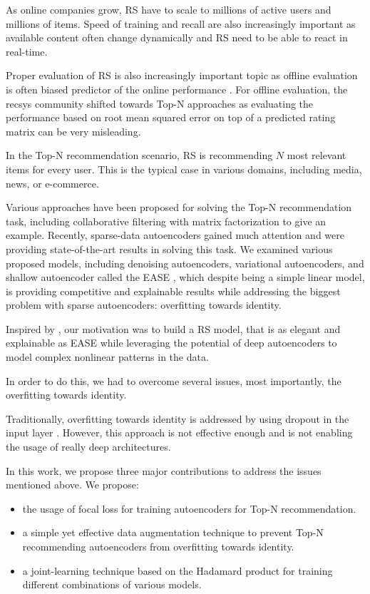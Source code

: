 \documentclass[conference]{IEEEtran}
\begin{document}
    As online companies grow, RS have to scale to millions of active users and millions of items. Speed of training and recall are also increasingly important as available content often change dynamically and RS need to be able to react in real-time. 
    
    Proper evaluation of RS is also increasingly important topic as offline evaluation is often biased predictor of the online performance \cite{rehorek2018comparing}. For offline evaluation, the recsys community shifted towards Top-N approaches \cite{karypis2001evaluation} as evaluating the performance based on root mean squared error on top of a predicted rating matrix can be very misleading.    
    
    In the Top-N recommendation scenario\cite{Cremonesi2010}, RS is recommending $N$ most relevant items for every user. This is the typical case in various domains, including media, news, or e-commerce.
    
    Various approaches have been proposed for solving the Top-N recommendation task, including collaborative filtering with matrix factorization to give an example. Recently, sparse-data autoencoders \cite{vincent2008extracting,ng2011sparse,Sedhain2015,Liang2018,Kim2019,Shenbin2020} gained much attention and were providing state-of-the-art results in solving this task.
We examined various proposed models, including denoising autoencoders, variational autoencoders, and shallow autoencoder called the EASE \cite{Steck2019}, which despite being a simple linear model, is providing competitive and explainable results while addressing the biggest problem with sparse autoencoders: overfitting towards identity.
    
    Inspired by \cite{Cheng2016}, our motivation was to build a RS model, that is as elegant and explainable as EASE while leveraging the potential of deep autoencoders to model complex nonlinear patterns in the data. 
    
    In order to do this, we had to overcome several issues, most importantly, the overfitting towards identity.

    Traditionally,  overfitting towards identity is addressed by using dropout in the input layer \cite{Liang2018,Shenbin2020,Kim2019}. However, this approach is not effective enough and is not enabling the usage of really deep architectures.

    In this work, we propose three major contributions to address the issues mentioned above.  We propose:
    \begin{itemize}
    \item the usage of focal loss for training autoencoders for Top-N recommendation. 
    \item a simple yet effective data augmentation technique to prevent Top-N recommending autoencoders from overfitting towards identity. 
    \item a joint-learning technique based on the Hadamard product for training different combinations of various models. 
    \end{itemize}
    
\end{document}
